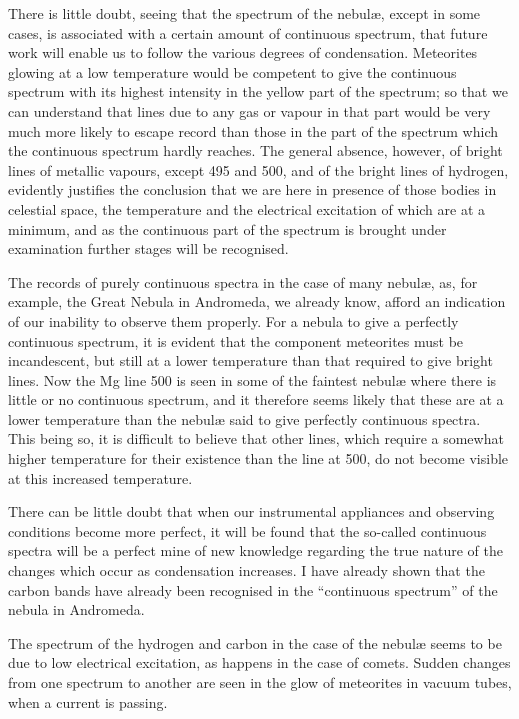 \documentclass[a4paper, 12pt, oneside, polutonikogreek, english]{article}
\begin{document}
There is little doubt, seeing that the spectrum of the nebulæ, except in some cases, is associated with a certain amount of continuous spectrum, that future work will enable us to follow the various degrees of condensation. Meteorites glowing at a low temperature would be competent to give the continuous spectrum with its highest intensity in the yellow part of the spectrum; so that we can understand that lines due to any gas or vapour in that part would be very much more likely to escape record than those in the part of the spectrum which the continuous spectrum hardly reaches. The general absence, however, of bright lines of metallic vapours, except 495 and 500, and of the bright lines of hydrogen, evidently justifies the conclusion that we are here in presence of those bodies in celestial space, the temperature and the electrical excitation of which are at a minimum, and as the continuous part of the spectrum is brought under examination further stages will be recognised.

The records of purely continuous spectra in the case of many nebulæ, as, for example, the Great Nebula in Andromeda, we already know, afford an indication of our inability to observe them properly. For a nebula to give a perfectly continuous spectrum, it is evident that the component meteorites must be incandescent, but still at a lower temperature than that required to give bright lines. Now the Mg line 500 is seen in some of the faintest nebulæ where there is little or no continuous spectrum, and it therefore seems likely that these are at a lower temperature than the nebulæ said to give perfectly continuous spectra. This being so, it is difficult to believe that other lines, which require a somewhat higher temperature for their existence than the line at 500, do not become visible at this increased temperature.

There can be little doubt that when our instrumental appliances and observing conditions become more perfect, it will be found that the so-called continuous spectra will be a perfect mine of new knowledge regarding the true nature of the changes which occur as condensation increases. I have already shown that the carbon bands have already been recognised in the ``continuous spectrum'' of the nebula in Andromeda.

The spectrum of the hydrogen and carbon in the case of the nebulæ seems to be due to low electrical excitation, as happens in the case of comets. Sudden changes from one spectrum to another are seen in the glow of meteorites in vacuum tubes, when a current is passing.
\end{document}
